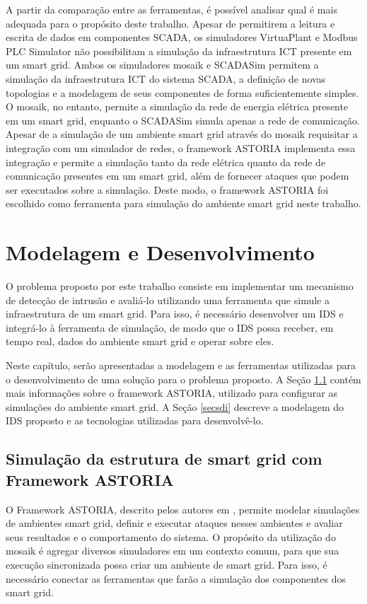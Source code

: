 \documentclass[cic,tc]{iiufrgs}
\begin{document}
A partir da comparação entre as ferramentas, é possível analisar qual é mais adequada para o propósito deste trabalho. Apesar de permitirem a leitura e escrita de dados em componentes SCADA, os simuladores VirtuaPlant e Modbus PLC Simulator não possibilitam a simulação da infraestrutura ICT presente em um smart grid. Ambos os simuladores mosaik e SCADASim permitem a simulação da infraestrutura ICT do sistema SCADA, a definição de novas topologias e a modelagem de seus componentes de forma suficientemente simples. O mosaik, no entanto, permite a simulação da rede de energia elétrica presente em um smart grid, enquanto o SCADASim simula apenas a rede de comunicação.
Apesar de a simulação de um ambiente smart grid através do mosaik requisitar a integração com um simulador de redes, o framework ASTORIA implementa essa integração e permite a simulação tanto da rede elétrica quanto da rede de comunicação presentes em um smart grid, além de fornecer ataques que podem ser executados sobre a simulação. Deste modo, o framework ASTORIA foi escolhido como ferramenta para simulação do ambiente smart grid neste trabalho.

\chapter{Modelagem e Desenvolvimento}
O problema proposto por este trabalho consiste em implementar um mecanismo de detecção de intrusão e avaliá-lo utilizando uma ferramenta que simule a infraestrutura de um smart grid. Para isso, é necessário desenvolver um IDS e integrá-lo à ferramenta de simulação, de modo que o IDS possa receber, em tempo real, dados do ambiente smart grid e operar sobre eles.
 
Neste capítulo, serão apresentadas a modelagem e as ferramentas utilizadas para o desenvolvimento de uma solução para o problema proposto. A Seção \ref{secastoria} contém mais informações sobre o framework ASTORIA, utilizado para configurar as simulações do ambiente smart grid. A Seção \ref{secsdi} descreve a modelagem do IDS proposto e as tecnologias utilizadas para desenvolvê-lo.
 
\section{Simulação da estrutura de smart grid com Framework ASTORIA}
\label{secastoria}

O Framework ASTORIA, descrito pelos autores em \cite{wermann2015astoria}, permite modelar simulações de ambientes smart grid, definir e executar ataques nesses ambientes e avaliar seus resultados e o comportamento do sistema.
O propósito da utilização do mosaik é agregar diversos simuladores em um contexto comum, para que sua execução sincronizada possa criar um ambiente de smart grid. Para isso, é necessário conectar as ferramentas que farão a simulação dos componentes dos smart grid.
 
\end{document}
